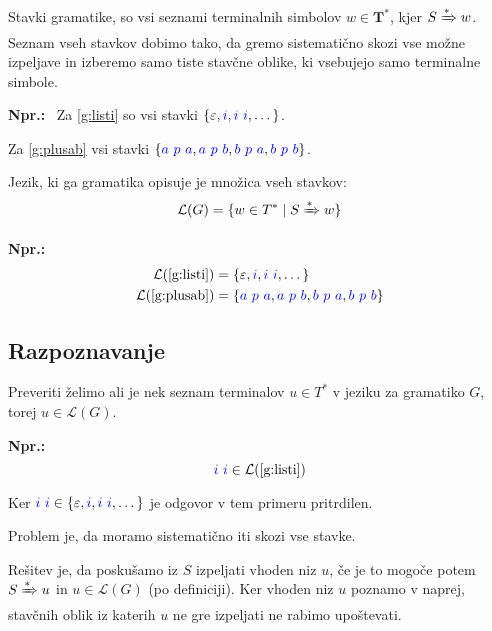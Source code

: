 \documentclass{article}
\newcommand{\Ex}{\textbf{Npr.:}\ }
\newcommand{\Set}[1]{\mathbf{#1}}
\newcommand{\Symbol}[1]{\textcolor{blue}{#1}}
\newcommand{\Grammar}{G}
\newcommand{\Terminals}{\Set{T}}
\newcommand{\StartSymbol}{S}
\newcommand{\Null}{\varepsilon}
\newcommand{\Language}[1]{\mathcal{L}(#1)}
\newcommand{\MathRef}[1]{\text{\ref{#1}}}
\newcommand{\DeriveStar}{\xRightarrow{\ast}}
\newcommand{\Seq}{\ }
\newcommand{\Kleene}[1]{#1^\ast}
\begin{document}
Stavki gramatike, so vsi seznami terminalnih simbolov $w \in \Kleene{\Terminals}$, kjer $\StartSymbol \DeriveStar w$.
Seznam vseh stavkov dobimo tako, da gremo sistematično skozi vse možne izpeljave in izberemo samo tiste stavčne oblike, ki vsebujejo samo terminalne simbole.

\Ex
Za \ref{g:listi} so vsi stavki $\{\Null, \Symbol{i}, \Symbol{i} \Seq \Symbol{i}, \dots\}$.

Za \ref{g:plusab} vsi stavki $\{\Symbol{a} \Seq \Symbol{p} \Seq \Symbol{a}, \Symbol{a} \Seq \Symbol{p} \Seq \Symbol{b}, \Symbol{b} \Seq \Symbol{p} \Seq \Symbol{a}, \Symbol{b} \Seq \Symbol{p} \Seq \Symbol{b} \}$.

Jezik, ki ga gramatika opisuje je množica vseh stavkov:
\begin{equation*}
  \Language{\Grammar} = \{ w \in \Kleene{T} \mid \StartSymbol \DeriveStar w\}
\end{equation*}

\Ex
  \begin{align*}
    \Language{\MathRef{g:listi}} &= \{\Null, \Symbol{i}, \Symbol{i} \Seq \Symbol{i}, \dots\}\\
    \Language{\MathRef{g:plusab}} &= \{\Symbol{a} \Seq \Symbol{p} \Seq \Symbol{a}, \Symbol{a} \Seq \Symbol{p} \Seq \Symbol{b}, \Symbol{b} \Seq \Symbol{p} \Seq \Symbol{a}, \Symbol{b} \Seq \Symbol{p} \Seq \Symbol{b} \}
  \end{align*}

\subsection{Razpoznavanje}

Preveriti želimo ali je nek seznam terminalov $u \in \Kleene{T}$ v jeziku za gramatiko $\Grammar$, torej $u \in \Language{\Grammar}$.

\Ex
  \begin{equation*}
    \Symbol{i} \Seq \Symbol{i} \in \Language{\MathRef{g:listi}}
  \end{equation*}

  Ker $\Symbol{i} \Seq \Symbol{i} \in \{\Null, \Symbol{i}, \Symbol{i} \Seq \Symbol{i}, \dots\}$ je odgovor v tem primeru pritrdilen.

Problem je, da moramo sistematično iti skozi vse stavke.

Rešitev je, da poskušamo iz $\StartSymbol$ izpeljati vhoden niz $u$, če je to mogoče potem $\StartSymbol \DeriveStar u$ in $u \in \Language{\Grammar}$ (po definiciji).
Ker vhoden niz $u$ poznamo v naprej, stavčnih oblik iz katerih $u$ ne gre izpeljati ne rabimo upoštevati.
\end{document}

